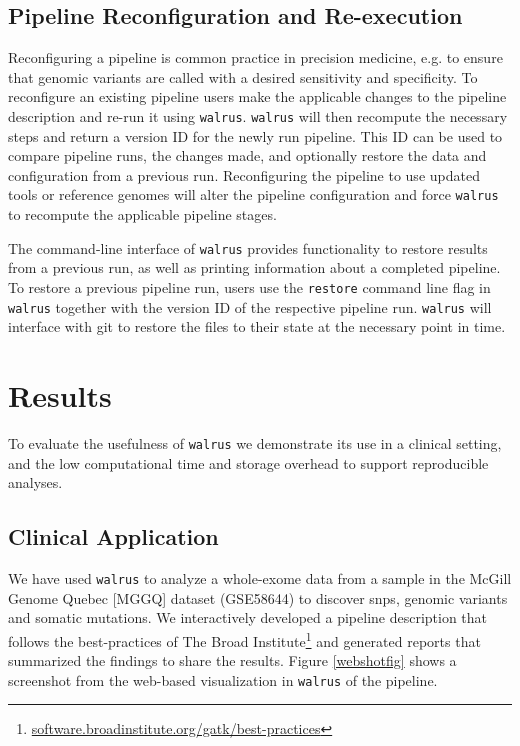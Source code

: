 \subsection{Pipeline Reconfiguration and Re-execution}
Reconfiguring a pipeline is common practice in precision medicine, e.g. to
ensure that genomic variants are called with a desired sensitivity and
specificity.  To reconfigure an existing pipeline users make the applicable
changes to the pipeline description and re-run it using \texttt{walrus}.
\texttt{walrus} will then recompute the necessary steps and return a version ID
for the newly run pipeline. This ID can be used to compare pipeline runs, the
changes made, and optionally restore the data and configuration from a
previous run.  Reconfiguring the pipeline to use updated tools or reference
genomes will alter the pipeline configuration and force \texttt{walrus} to
recompute the applicable pipeline stages. 

The command-line interface of \texttt{walrus} provides functionality to restore
results from a previous run, as well as printing information about a completed
pipeline.  To restore a previous pipeline run, users use the \texttt{restore}
command line flag in \texttt{walrus} together with the version ID of the
respective pipeline run. \texttt{walrus} will interface with git to restore the
files to their state at the necessary point in time.

\section{Results}
To evaluate the usefulness of \texttt{walrus} we demonstrate its use in a
clinical setting, and the low computational time and storage overhead to support
reproducible analyses.

\subsection{Clinical Application} 
We have used \texttt{walrus} to analyze a whole-exome data from a sample
in the McGill Genome Quebec [MGGQ] dataset (GSE58644)\cite{tofigh2014prognostic}
to discover \glspl{snp}, genomic variants and somatic mutations. We
interactively developed a pipeline description that follows the best-practices
of The Broad
Institute\footnote{\url{software.broadinstitute.org/gatk/best-practices}} and
generated reports that summarized the findings to share the results. Figure
\ref{webshotfig} shows a screenshot from the web-based visualization in
\texttt{walrus} of the pipeline. 


